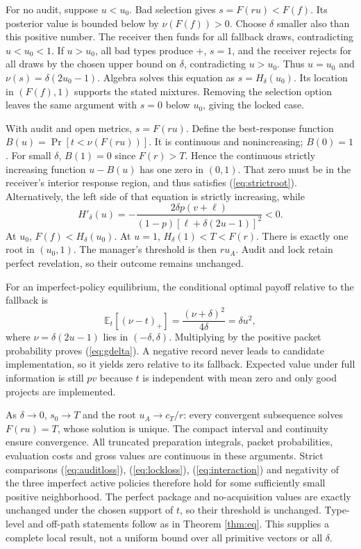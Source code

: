 \documentclass[11pt]{article}
\newcommand{\E}{\mathbb E}
\begin{document}
For no audit, suppose $u<u_0$. Bad selection gives $s=F(ru)<F(f)$. Its posterior value is bounded below by $\nu(F(f))>0$. Choose $\delta$ smaller also than this positive number. The receiver then funds for all fallback draws, contradicting $u<u_0<1$. If $u>u_0$, all bad types produce $+$, $s=1$, and the receiver rejects for all draws by the chosen upper bound on $\delta$, contradicting $u>u_0$. Thus $u=u_0$ and $\nu(s)=\delta(2u_0-1)$. Algebra solves this equation as $s=H_\delta(u_0)$. Its location in $(F(f),1)$ supports the stated mixtures. Removing the selection option leaves the same argument with $s=0$ below $u_0$, giving the locked case.

With audit and open metrics, $s=F(ru)$. Define the best-response function $B(u)=\Pr[t<\nu(F(ru))]$. It is continuous and nonincreasing; $B(0)=1$. For small $\delta$, $B(1)=0$ since $F(r)>T$. Hence the continuous strictly increasing function $u-B(u)$ has one zero in $(0,1)$. That zero must be in the receiver's interior response region, and thus satisfies (\ref{eq:strictroot}). Alternatively, the left side of that equation is strictly increasing, while
\[
H'_\delta(u)=-\frac{2\delta p(v+\ell)}{(1-p)[\ell+\delta(2u-1)]^2}<0.
\]
At $u_0$, $F(f)<H_\delta(u_0)$. At $u=1$, $H_\delta(1)<T<F(r)$. There is exactly one root in $(u_0,1)$. The manager's threshold is then $ru_A$. Audit and lock retain perfect revelation, so their outcome remains unchanged.

For an imperfect-policy equilibrium, the conditional optimal payoff relative to the fallback is
\[
\E_t[(\nu-t)_+]=\frac{(\nu+\delta)^2}{4\delta}=\delta u^2,
\]
where $\nu=\delta(2u-1)$ lies in $(-\delta,\delta)$. Multiplying by the positive packet probability proves (\ref{eq:gdelta}). A negative record never leads to candidate implementation, so it yields zero relative to its fallback. Expected value under full information is still $pv$ because $t$ is independent with mean zero and only good projects are implemented.

As $\delta\to0$, $s_0\to T$ and the root $u_A\to c_T/r$: every convergent subsequence solves $F(ru)=T$, whose solution is unique. The compact interval and continuity ensure convergence. All truncated preparation integrals, packet probabilities, evaluation costs and gross values are continuous in these arguments. Strict comparisons (\ref{eq:auditloss}), (\ref{eq:lockloss}), (\ref{eq:interaction}) and negativity of the three imperfect active policies therefore hold for some sufficiently small positive neighborhood. The perfect package and no-acquisition values are exactly unchanged under the chosen support of $t$, so their threshold is unchanged. Type-level and off-path statements follow as in Theorem \ref{thm:eq}. This supplies a complete local result, not a uniform bound over all primitive vectors or all $\delta$.
\end{document}
